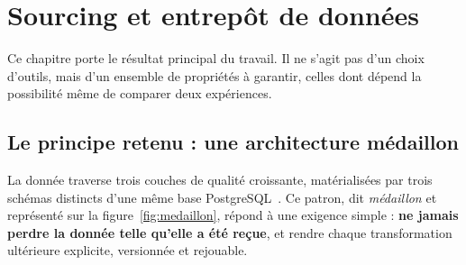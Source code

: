 \chapter{Sourcing et entrepôt de données}
\label{ch:entrepot}


Ce chapitre porte le résultat principal du travail. Il ne s'agit pas d'un choix d'outils, mais
d'un ensemble de propriétés à garantir, celles dont dépend la possibilité même de comparer
deux expériences.

\section{Le principe retenu : une architecture médaillon}

La donnée traverse trois couches de qualité croissante, matérialisées par trois schémas
distincts d'une même base PostgreSQL~\cite{postgresql}. Ce patron, dit \emph{médaillon} et
représenté sur la figure~\ref{fig:medaillon}, répond à une exigence simple : \textbf{ne jamais
perdre la donnée telle qu'elle a été reçue}, et rendre chaque transformation ultérieure
explicite, versionnée et rejouable.

